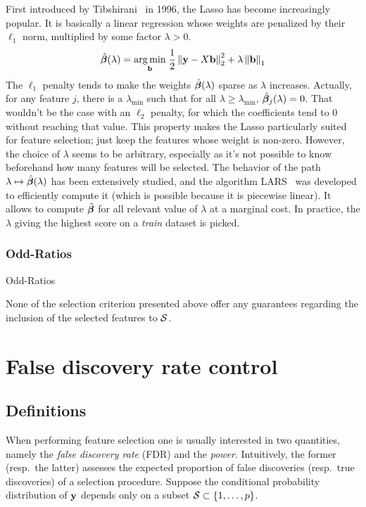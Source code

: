 First introduced by Tibshirani~\cite{lasso} in 1996,
the Lasso has become increasingly popular.
It is basically a linear regression whose weights are penalized by their $\ell_1$ norm,
multiplied by some factor $\lambda > 0$.
%
\begin{equation}\label{eq:lasso}
        \hat{\bm{\beta}}(\lambda) =
        \underset{\mathbf{b}}{\operatorname*{arg\,min}}\;
                \frac{1}{2}\left\lVert\mathbf{y} - X\mathbf{b}\right\rVert_2^2 + \lambda\left\lVert\mathbf{b}\right\rVert_1
\end{equation}
%
The $\ell_1$ penalty tends to make the weights $\hat{\bm{\beta}}(\lambda)$ sparse as $\lambda$ increases.
Actually, for any feature $j$,
there is a $\lambda_{\min}$ such that for all $\lambda \geq \lambda_{\min}$,
$\hat{\bm{\beta}}_j(\lambda) = 0$.
That wouldn't be the case with an $\ell_2$ penalty,
for which the coefficients tend to $0$ without reaching that value.
This property makes the Lasso particularly suited for feature selection;
just keep the features whose weight is non-zero.
However, the choice of $\lambda$ seems to be arbitrary,
especially as it's not possible to know beforehand how many features will be selected.
The behavior of the path $\lambda \mapsto \hat{\bm{\beta}}(\lambda)$ has been extensively studied,
and the algorithm LARS~\cite{lars} was developed to efficiently compute it
(which is possible because it is piecewise linear).
It allows to compute $\hat{\bm{\beta}}$ for all relevant value of $\lambda$ at a marginal cost.
In practice, the $\lambda$ giving the highest score on a \emph{train} dataset is picked.


\subsubsection{Odd-Ratios}
Odd-Ratios~\cite{Mladenic1999FeatureSF}


None of the selection criterion presented above offer any guarantees regarding
the inclusion of the selected features to $\mathcal{S}$.


\section{False discovery rate control}\label{sec:fdrc}
%
\subsection{Definitions}\label{subsec:fdr_def}
%
When performing feature selection one is usually interested in two quantities,
namely the \emph{false discovery rate} (FDR) and the \emph{power}.
Intuitively, the former (resp.\ the latter) assesses the expected proportion of false discoveries
(resp.\ true discoveries) of a selection procedure.
Suppose the conditional probability distribution of $\mathbf{y}$ depends only on a subset
$\mathcal{S} \subset \left\{ 1, \dots, p \right\}$.

